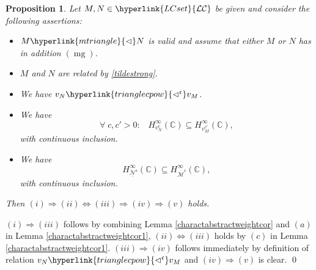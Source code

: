 \documentclass[10pt]{amsart}%
\numberwithin{equation}{section}
\theoremstyle{plain}
\newtheorem{proposition}{Proposition}[section]
\newcommand{\CC}{\mathbb{C}}
\let\on=\operatorname
\begin{document}
\begin{proposition}\label{charactprop2foropow}
	Let $M,N\in\hyperlink{LCset}{\mathcal{LC}}$ be given and consider the following assertions:
	\begin{itemize}
		\item[$(i)$] $M\hyperlink{mtriangle}{\vartriangleleft}N$ is valid and assume that either $M$ or $N$ has in addition \hyperlink{mg}{$(\on{mg})$}.

\item[$(ii)$] $M$ and $N$ are related by \eqref{tildestrong}.
		
		\item[$(iii)$] We have $v_N\hyperlink{trianglecpow}{\vartriangleleft^{\mathfrak{c}}}v_M$.
		
		\item[$(iv)$] We have
		\begin{equation}\label{charactprop2equforopow}
			\forall\;c,c'>0:\;\;\;H^{\infty}_{v^c_{N}}(\CC)\subseteq H^{\infty}_{v^{c'}_{M}}(\CC),
		\end{equation}
		with continuous inclusion.
		
		\item[$(v)$] We have
		\begin{equation}\label{charactprop2equ1foropow}
			H^{\infty}_{\underline{\mathcal{N}}^{\mathfrak{c}}}(\CC)\subseteq H^{\infty}_{\overline{\mathcal{M}}^{\mathfrak{c}}}(\CC),
		\end{equation}
		with continuous inclusion.
	\end{itemize}
	Then $(i)\Rightarrow(ii)\Leftrightarrow(iii)\Rightarrow(iv)\Rightarrow(v)$ holds.
\end{proposition}

$(i)\Rightarrow(iii)$ follows by combining Lemma \ref{charactabstractweightcor} and $(a)$ in Lemma \ref{charactabstractweightcor1}, $(ii)\Leftrightarrow(iii)$ holds by $(c)$ in Lemma \ref{charactabstractweightcor1}. $(iii)\Rightarrow(iv)$ follows immediately by definition of relation $v_N\hyperlink{trianglecpow}{\vartriangleleft^{\mathfrak{c}}}v_M$ and $(iv)\Rightarrow(v)$ is clear.
\qed\enddemo
\end{document}
